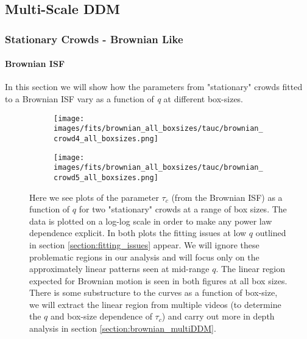 \documentclass[10pt]{article}
\begin{document}
\subsection{Multi-Scale DDM}

\subsubsection{Stationary Crowds - Brownian Like}
\paragraph{Brownian ISF} In this section we will show how the parameters from "stationary" crowds fitted to a Brownian ISF vary as a function of \textit{q} at different box-sizes. 
\begin{figure}[H]
\begin{subfigure}[t]{.5\textwidth}
  \centering
 \texttt{[image: images/fits/brownian\_all\_boxsizes/tauc/brownian\_crowd4\_all\_boxsizes.png]}
  \caption{}
\end{subfigure}%
\hfill
\begin{subfigure}[t]{.5\textwidth}
  \centering
  \texttt{[image: images/fits/brownian\_all\_boxsizes/tauc/brownian\_crowd5\_all\_boxsizes.png]}
  \caption{}
\end{subfigure}
\caption{Here we see plots of the parameter $\tau_c$ (from the Brownian ISF) as a function of $q$ for two "stationary" crowds at a range of box sizes. The data is plotted on a log-log scale in order to make any power law dependence explicit. In both plots the fitting issues at low $q$ outlined in section \ref{section:fitting_issues} appear. We will ignore these problematic regions in our analysis and will focus only on the approximately linear patterns seen at mid-range $q$. The linear region expected for Brownian motion is seen in both figures at all box sizes. There is some substructure to the curves as a function of box-size, we will extract the linear region from multiple videos (to determine the $q$ and box-size dependence of $\tau_c$) and carry out more in depth analysis in section \ref{section:brownian_multiDDM}.}
\label{fig:crowd_brownian_fits_tauc_all_boxsizes}
\end{figure}
\end{document}
